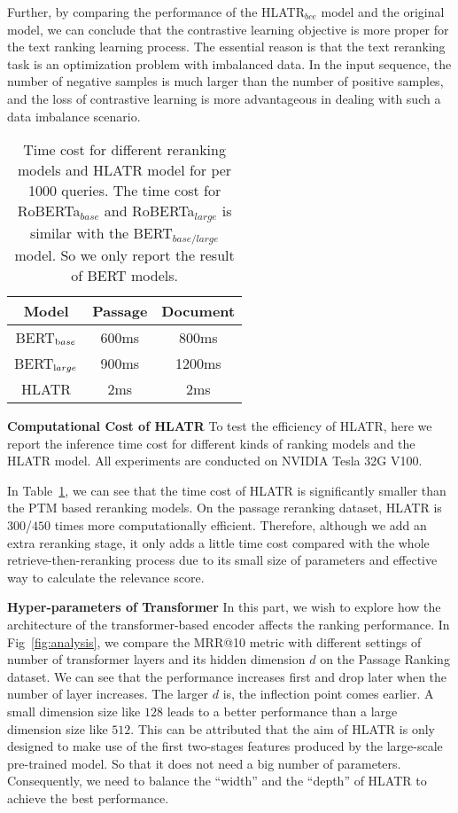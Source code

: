 \documentclass[11pt]{article}
\begin{document}
Further, by comparing the performance of the HLATR$_{bce}$ model and the original model, we can conclude that the contrastive learning objective is more proper for the text ranking learning process. The essential reason is that the text reranking task is an optimization problem with imbalanced data. In the input sequence, the number of negative samples is much larger than the number of positive samples, and the loss of contrastive learning is more advantageous in dealing with such a data imbalance scenario.

\begin{table}[]
\centering
\caption{Time cost for different reranking models and HLATR model for per 1000 queries. The time cost for RoBERTa$_{base}$ and RoBERTa$_{large}$ is similar with the BERT$_{base/large}$ model. So we only report the result of BERT models.}
\label{tab:time}
\begin{tabular}{c|c|c}
\toprule
Model      & Passage   & Document   \\ \midrule
BERT$_{\text base}$        & 600ms         & 800ms          \\ \midrule
BERT$_{\text large}$      & 900ms          & 1200ms         \\ \midrule
HLATR        & 2ms         & 2ms          \\ \bottomrule
\end{tabular}
\end{table}

\vspace{0.15cm}
\noindent \textbf{Computational Cost of HLATR} To test the efficiency of HLATR, here we report the inference time cost for different kinds of ranking models and the HLATR model. All experiments are conducted on NVIDIA Tesla 32G V100. 

In Table~\ref{tab:time}, we can see that the time cost of HLATR is significantly smaller than the PTM based reranking models. On the passage reranking dataset, HLATR is $300$/$450$ times more computationally efficient. Therefore, although we add an extra reranking stage, it only adds a little time cost compared with the whole retrieve-then-reranking process due to its small size of parameters and effective way to calculate the relevance score.

\noindent \textbf{Hyper-parameters of Transformer} In this part, we wish to explore how the architecture of the transformer-based encoder affects the ranking performance. In Fig~\ref{fig:analysis}, we compare the MRR@10 metric with different settings of number of transformer layers and its hidden dimension $d$ on the Passage Ranking dataset. We can see that the performance increases first and drop later when the number of layer increases. The larger $d$ is, the inflection point comes earlier. A small dimension size like $128$ leads to a better performance than a large dimension size like $512$. This can be attributed that the aim of HLATR is only designed to make use of the first two-stages features produced by the large-scale pre-trained model. So that it does not need a big number of parameters. Consequently, we need to balance the ``width'' and the ``depth'' of HLATR to achieve the best performance.
\end{document}
